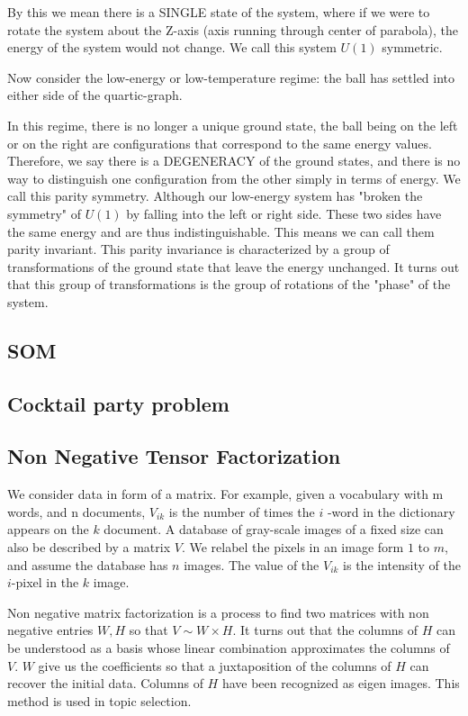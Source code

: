 \documentclass[11pt,letterpaper]{report}
\begin{document}
By this we mean there is a SINGLE state of the system, where if we were to rotate the system about the Z-axis (axis running through center of parabola), the energy of the system would not change. We call this system $U(1)$ symmetric. 

Now consider the low-energy or low-temperature regime: the ball has settled into either side of the quartic-graph. 

In this regime, there is no longer a unique ground state, the ball being on the left or on the right are configurations that correspond to the same energy values. Therefore, we say there is a DEGENERACY of the ground states, and there is no way to distinguish one configuration from the other simply in terms of energy. We call this parity symmetry. Although our low-energy system has "broken the symmetry" of $U(1)$ by falling into the left or right side. These two sides have the same energy and are thus indistinguishable. This means we can call them parity invariant. This parity invariance is characterized by a group of transformations of the ground state that leave the energy unchanged. It turns out that this group of transformations is the group of rotations of the "phase" of the system. 




\subsection{SOM}
 \subsection{Cocktail party problem}
 \subsection{Non Negative Tensor Factorization}
 
We consider data in form of a matrix. For example, given a vocabulary with  m  words, and  n  documents,  $V_{ik}$ is  the number of times the  $i$ -word in the dictionary appears on the  $k$  document.
A database of gray-scale images of a fixed size can also be described by a matrix $V$.  We relabel the pixels in an image form $1$ to $ m$, and assume the  database has $n$ images. The value of the $V_{ik}$ is the intensity of the $i$-pixel in the $k$ image. 

Non negative matrix factorization is a process to find two matrices with non negative entries $W,H$ so that $V\sim W\times H$. It turns out that the columns of $H$ can be understood as a basis whose linear combination approximates the columns of $V$. $W$ give us the coefficients so that a juxtaposition of the columns of  $H$ can recover the initial data. Columns of $H$ have been recognized as eigen images. This method is used in topic selection.  
 
\end{document}
